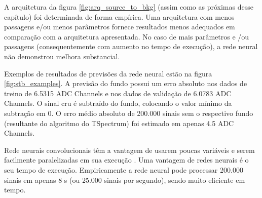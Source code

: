 \documentclass[a4paper,12pt,oneside]{book}
\begin{document}

\par A arquitetura da figura \ref{fig:arq_source_to_bkg} (assim como as próximas desse capítulo) foi determinada de forma empírica. Uma arquitetura com menos passagens e/ou menos parâmetros fornece resultados menos adequados em comparação com a arquitetura apresentada. No caso de mais parâmetros e /ou passagens (consequentemente com aumento no tempo de execução), a rede neural não demonstrou melhora substancial.

\par Exemplos de resultados de previsões da rede neural estão na figura \ref{fig:stb_examples}. A previsão do fundo possui um erro absoluto nos dados de treino de 6.5315 ADC Channels e nos dados de validação de 6.0783 ADC Channels. O sinal cru é subtraído do fundo, colocando o valor mínimo da subtração em 0. O erro médio absoluto de 200.000 sinais sem o respectivo fundo (resultante do algoritmo do TSpectrum) foi estimado em apenas 4.5 ADC Channels.

\par Rede neurais convolucionais têm a vantagem de usarem poucas variáveis e serem facilmente paralelizadas em sua execução \cite{mlbook}. Uma vantagem de redes neurais é o seu tempo de execução. Empiricamente a rede neural pode processar 200.000 sinais em apenas 8 s (ou 25.000 sinais por segundo), sendo muito eficiente em tempo.
\end{document}
